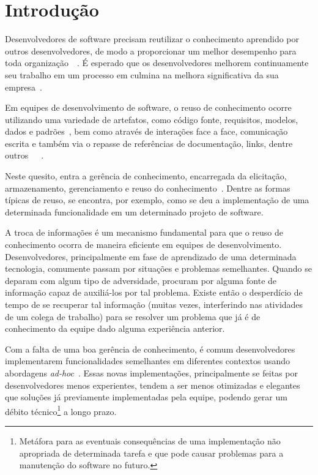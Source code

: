 \chapter{Introdução}

Desenvolvedores de software precisam reutilizar o conhecimento aprendido por outros desenvolvedores, de modo a proporcionar um melhor desempenho para toda organização~\cite{Druker1993}~\cite{Wiig2003}.
É esperado que os desenvolvedores melhorem continuamente seu trabalho em um processo em culmina na melhora significativa da sua empresa~\cite{Kavitha2011}.

Em equipes de desenvolvimento de software, o reuso de conhecimento ocorre utilizando uma variedade de artefatos, como código fonte, requisitos, modelos, dados e padrões~\cite{Levy2009}, bem como através de interações face a face, comunicação escrita e também via o repasse de referências de documentação, links, dentre outros~\cite{Storey2014}~\cite{Olson2000}~\cite{CubraniC2004}.

Neste quesito, entra a gerência de conhecimento, encarregada da elicitação, armazenamento, gerenciamento e reuso do conhecimento~\cite{Levy2009}.
Dentre as formas típicas de reuso, se encontra, por exemplo, como se deu a implementação de uma determinada funcionalidade em um determinado projeto de software.

A troca de informações é um mecanismo fundamental para que o reuso de conhecimento ocorra de maneira eficiente em equipes de desenvolvimento. Desenvolvedores, principalmente em fase de aprendizado de uma determinada tecnologia, comumente passam por situações e problemas semelhantes. Quando se deparam com algum tipo de adversidade, procuram por alguma fonte de informação capaz de auxiliá-los por tal problema. Existe então o desperdício de tempo de se recuperar tal informação (muitas vezes, interferindo nas atividades de um colega de trabalho) para se resolver um problema que já é de conhecimento da equipe dado alguma experiência anterior.

Com a falta de uma boa gerência de conhecimento, é comum desenvolvedores implementarem funcionalidades semelhantes em diferentes contextos usando abordagens \textit{ad-hoc}~\cite{SangMok2011}. Essas novas implementações, principalmente se feitas por desenvolvedores menos experientes, tendem a ser menos otimizadas e elegantes que soluções já previamente implementadas pela equipe, podendo gerar um débito técnico\footnote{Metáfora para as eventuais consequências de uma implementação não apropriada de determinada tarefa e que pode causar problemas para a manutenção do software no futuro.} a longo prazo.

